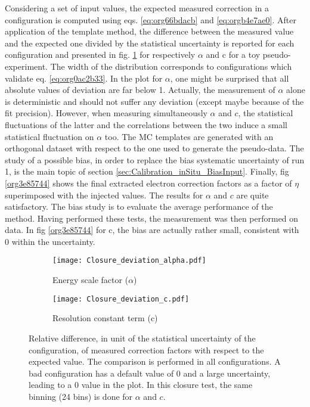 Considering a set of input values, the expected measured correction in a configuration is computed using eqs. \ref{eq:org66bdacb} and \ref{eq:orgb4e7ae0}.
After application of the template method, the difference between the measured value and the expected one divided by the statistical uncertainty is reported for each configuration and presented in fig. \ref{orge48e2b5} for respectively \(\alpha\) and c for a toy pseudo-experiment.
The width of the distribution corresponds to configurations which validate eq. \ref{eq:org0ac2b33}.
In the plot for $\alpha$, one might be surprised that all absolute values of deviation are far below 1.
Actually, the measurement of $\alpha$ alone is deterministic and should not suffer any deviation (except maybe because of the fit precision).
However, when measuring simultaneously $\alpha$ and $c$, the statistical fluctuations of the latter and the correlations between the two induce a small statistical fluctuation on $\alpha$ too.
The MC templates are generated with an orthogonal dataset with respect to the one used to generate the pseudo-data.
The study of a possible bias, in order to replace the bias systematic uncertainty of run 1, is the main topic of section \ref{sec:Calibration_inSitu_BiasInput}.
Finally, fig \ref{org3e85744} shows the final extracted electron correction factors as a factor of $\eta$ superimposed with the injected values.
The results for $\alpha$ and $c$ are quite satisfactory.
The bias study is to evaluate the average performance of the method.
Having performed these tests, the measurement was then performed on data.
In fig \ref{org3e85744} for c, the bias are actually rather small, consistent with 0 within the uncertainty.

\begin{figure}
\begin{subfigure}[t]{0.49\linewidth}
\begin{center}
\texttt{[image: Closure\_deviation\_alpha.pdf]}
\end{center}
\caption{Energy scale factor (\(\alpha\))}
\end{subfigure}
\begin{subfigure}[t]{0.49\linewidth}
\begin{center}
\texttt{[image: Closure\_deviation\_c.pdf]}
\end{center}
\caption{Resolution constant term (c)}
\end{subfigure}
\caption{\label{orge48e2b5}
  Relative difference, in unit of the statistical uncertainty of the configuration, of measured correction factors with respect to the expected value.
  The comparison is performed in all configurations. A bad configuration has a default value of 0 and a large uncertainty, leading to a 0 value in the plot.
  In this closure test, the same binning (24 bins) is done for $\alpha$ and $c$.
}
\end{figure}


